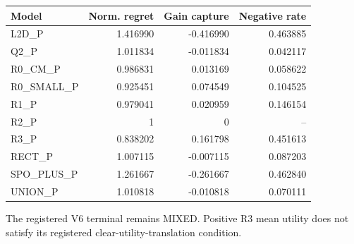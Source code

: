 \begin{center}
\begin{minipage}{\linewidth}
\centering
\small
\setlength{\tabcolsep}{4pt}
\label{tab:voc-decision}
\begin{tabular}{lrrr}
\toprule
Model & Norm. regret & Gain capture & Negative rate \\
\midrule
L2D\_P & 1.416990 & -0.416990 & 0.463885 \\
Q2\_P & 1.011834 & -0.011834 & 0.042117 \\
R0\_CM\_P & 0.986831 & 0.013169 & 0.058622 \\
R0\_SMALL\_P & 0.925451 & 0.074549 & 0.104525 \\
R1\_P & 0.979041 & 0.020959 & 0.146154 \\
R2\_P & 1 & 0 & -- \\
R3\_P & 0.838202 & 0.161798 & 0.451613 \\
RECT\_P & 1.007115 & -0.007115 & 0.087203 \\
SPO\_PLUS\_P & 1.261667 & -0.261667 & 0.462840 \\
UNION\_P & 1.010818 & -0.010818 & 0.070111 \\
\bottomrule
\end{tabular}
\par\smallskip\begin{minipage}{\linewidth}\small The registered V6 terminal remains MIXED. Positive R3 mean utility does not satisfy its registered clear-utility-translation condition.\end{minipage}
\end{minipage}
\end{center}
